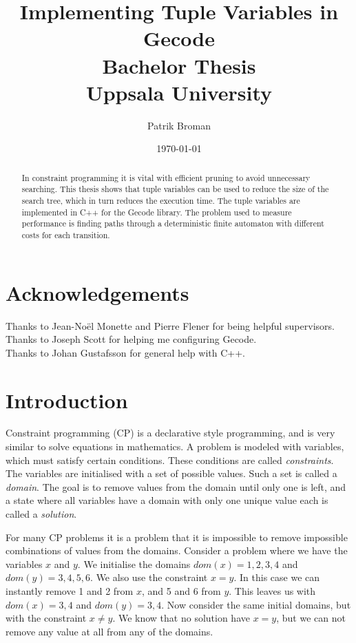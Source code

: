 \documentclass[a4paper,11pt]{article}
\title{\textbf{Implementing Tuple Variables in Gecode\\
	Bachelor Thesis \\
    Uppsala University  \\
  }
}
\author{Patrik Broman}
\date{\today}
\begin{document}
\maketitle

\begin{abstract}

In constraint programming it is vital with efficient pruning to avoid unnecessary searching. This thesis shows that tuple variables can be used to reduce the size of the search tree, which in turn reduces the execution time. The tuple variables are implemented in C++ for the Gecode library. The problem used to measure performance is finding paths through a deterministic finite automaton with different costs for each transition.
\end{abstract}

\setcounter{tocdepth}{2}
\tableofcontents

\section*{Acknowledgements}
Thanks to Jean-No\"{e}l Monette and Pierre Flener for being helpful supervisors. \\
Thanks to Joseph Scott for helping me configuring Gecode. \\
Thanks to Johan Gustafsson for general help with C++. \\

\section{Introduction}
Constraint programming (CP) is a declarative style programming, and is very similar to solve equations in mathematics. A problem is modeled with variables, which must satisfy certain conditions. These conditions are called \textit{constraints}. The variables are initialised with a set of possible values. Such a set is called a \textit{domain}. The goal is to remove values from the domain until only one is left, and a state where all variables have a domain with only one unique value each is called a \textit{solution}.

For many CP problems it is a problem that it is impossible to remove impossible combinations of values from the domains. Consider a problem where we have the variables $x$ and $y$. We initialise the domains $dom(x)={1,2,3,4}$ and $dom(y)={3,4,5,6}$. We also use the constraint $x=y$. In this case we can instantly remove 1 and 2 from $x$, and 5 and 6 from $y$. This leaves us with $dom(x)={3,4}$ and $dom(y)={3,4}$. Now consider the same initial domains, but with the constraint $x\neq y$. We know that no solution have $x=y$, but we can not remove any value at all from any of the domains. 
\end{document}
